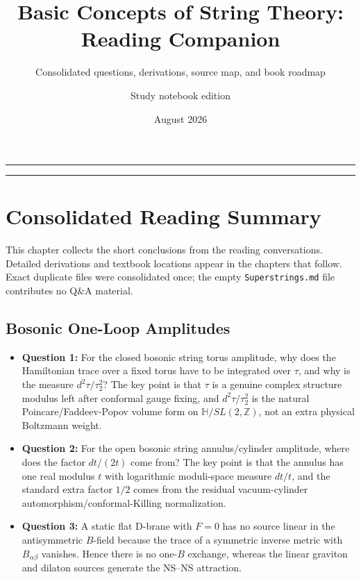 \documentclass[
  10pt,
  a4paper,
  openany]{book}
\title{Basic Concepts of String Theory: Reading Companion}
\subtitle{Consolidated questions, derivations, source map, and book
roadmap}
\author{Study notebook edition}
\date{August 2026}
\makeatletter
\providecommand{\tightlist}{%
  \setlength{\itemsep}{0pt}\setlength{\parskip}{0pt}}
\providecommand{\@subtitle}{}
\renewcommand{\maketitle}{%
  \begin{titlepage}
    \thispagestyle{empty}
    \centering
    \vspace*{0.14\textheight}
    {\color{chapterblue}\rule{0.78\textwidth}{1.25pt}\par}
    \vspace{2.2em}
    {\sffamily\bfseries\color{chapterblue}\fontsize{29}{35}\selectfont
      \@title\par}
    \vspace{1.4em}
    {\sffamily\color{titlegray}\fontsize{15}{21}\selectfont
      \@subtitle\par}
    \vspace{2.2em}
    {\color{chapterblue}\rule{0.38\textwidth}{0.55pt}\par}
    \vfill
    {\sffamily\large\color{titlegray}\@author\par}
    \vspace{0.7em}
    {\sffamily\normalsize\color{titlegray}\@date\par}
    \vspace*{0.08\textheight}
  \end{titlepage}}
\makeatother
\begin{document}
\frontmatter
\maketitle

{
\hypersetup{linkcolor=}
\setcounter{tocdepth}{1}
\tableofcontents
}
\mainmatter
\setcounter{chapter}{-1}

\chapter{Consolidated Reading
Summary}\label{consolidated-reading-summary}

This chapter collects the short conclusions from the reading
conversations. Detailed derivations and textbook locations appear in the
chapters that follow. Exact duplicate files were consolidated once; the
empty \texttt{Superstrings.md} file contributes no Q\&A material.

\section{Bosonic One-Loop Amplitudes}\label{bosonic-one-loop-amplitudes}

\begin{itemize}
\tightlist
\item
  \textbf{Question 1:} For the closed bosonic string torus amplitude,
  why does the Hamiltonian trace over a fixed torus have to be
  integrated over \(\tau\), and why is the measure \(d^2\tau/\tau_2^2\)?
  The key point is that \(\tau\) is a genuine complex structure modulus
  left after conformal gauge fixing, and \(d^2\tau/\tau_2^2\) is the
  natural Poincare/Faddeev-Popov volume form on
  \(\mathbb H/SL(2,\mathbb Z)\), not an extra physical Boltzmann weight.
\item
  \textbf{Question 2:} For the open bosonic string annulus/cylinder
  amplitude, where does the factor \(dt/(2t)\) come from? The key point
  is that the annulus has one real modulus \(t\) with logarithmic
  moduli-space measure \(dt/t\), and the standard extra factor \(1/2\)
  comes from the residual vacuum-cylinder automorphism/conformal-Killing
  normalization.
\item
  \textbf{Question 3:} A static flat D-brane with \(F=0\) has no source
  linear in the antisymmetric \(B\)-field because the trace of a
  symmetric inverse metric with \(B_{\alpha\beta}\) vanishes. Hence
  there is no one-\(B\) exchange, whereas the linear graviton and
  dilaton sources generate the NS--NS attraction.
\end{itemize}
\end{document}
